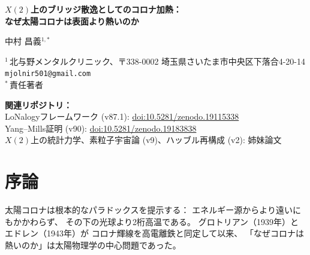 \documentclass[12pt]{article}
\theoremstyle{plain}
\theoremstyle{definition}
\numberwithin{equation}{section}
\newcommand{\br}{\mathrm{br}}
\DeclareMathOperator{\sech}{sech}
\begin{document}
\begin{titlepage}
\centering
\vspace*{1cm}
{\LARGE\bfseries $X(2)$上のブリッジ散逸としてのコロナ加熱：\\[6pt]
なぜ太陽コロナは表面より熱いのか}
\vspace{1.5cm}

{\large 中村 昌義$^{1,*}$}
\vspace{0.8cm}

{\normalsize
$^1$\,北与野メンタルクリニック、〒338-0002
埼玉県さいたま市中央区下落合4-20-14\\
\texttt{mjolnir501@gmail.com}\\[4pt]
$^*$\,責任著者
}
\vspace{0.8cm}

{\small
\noindent\textbf{関連リポジトリ：}\\
LoNalogyフレームワーク (v87.1):
\href{https://doi.org/10.5281/zenodo.19115338}{doi:10.5281/zenodo.19115338}\\
Yang--Mills証明 (v90):
\href{https://doi.org/10.5281/zenodo.19183838}{doi:10.5281/zenodo.19183838}\\
$X(2)$上の統計力学、素粒子宇宙論 (v9)、ハッブル再構成 (v2): 姉妹論文
}
\vspace{1.0cm}

\begin{abstract}
\noindent
太陽コロナ加熱問題——コロナ（$T\sim10^6\,\mathrm{K}$）が
光球（$T\sim6\times10^3\,\mathrm{K}$）より2桁高温であること——は
70年以上にわたり決定的な解決を拒んできた。
LoNalogyフレームワークにおいて、温度逆転が一行の定理であることを示す：
一粒子あたりの加熱$q_{\br}(s)=Q_{\br}(s)/n(s)$は
ブリッジピークに向かって単調増加する。
$\sech^2$ブリッジ散逸プロファイルが指数的に減少する密度で割られるからである。
定常エネルギーバランスはコロナにおける温度極大を強制する。
70年間の波加熱 vs ナノフレア/再結合加熱の論争は、
両者が同一の正のブリッジ二次形式
$Q_0=\eta\langle J,\Delta_{\br}J\rangle$の
基底分解であることを示して解消される。
\end{abstract}
\end{titlepage}

\setcounter{page}{1}
\tableofcontents
\newpage


\section{序論}\label{sec:intro}

太陽コロナは根本的なパラドックスを提示する：
エネルギー源からより遠いにもかかわらず、
その下の光球より2桁高温である。
グロトリアン（1939年）とエドレン（1943年）が
コロナ輝線を高電離鉄と同定して以来、
「なぜコロナは熱いのか」は太陽物理学の中心問題であった。
\end{document}
